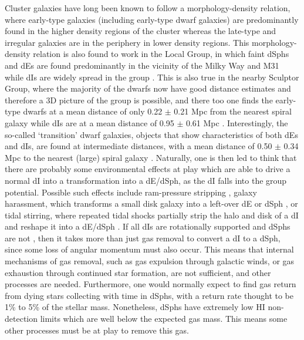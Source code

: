 \documentclass[preprint]{aastex}
\begin{document}
Cluster galaxies have long been known to follow a morphology-density
relation, where early-type galaxies (including early-type dwarf galaxies)
are predominantly found in the higher density regions of the cluster whereas
the late-type and irregular galaxies are in the periphery in lower
density regions. This morphology-density relation is also found to work
in the Local Group, in which faint dSphs and dEs
are found predominantly in the vicinity of the Milky Way and M31 while
dIs are widely spread in the group \citep{vdb94a}.
This is also true in the nearby Sculptor Group, where the 
majority of the dwarfs now have good distance estimates and therefore a 3D
picture of the group is possible, and there too one finds the early-type
dwarfs at a mean distance of only 0.22 $\pm$ 0.21 Mpc from the nearest spiral  
galaxy while dIs are at a mean distance of 0.95 $\pm$ 0.61 Mpc \citep{scm03a}. 
Interestingly, the so-called `transition' dwarf galaxies,
objects that show characteristics of both dEs and dIs, are found
at intermediate distances,
with a mean distance of 0.50 $\pm$ 0.34 Mpc to the nearest
(large) spiral galaxy \citep{scm03a}. Naturally, one is then led to think that there
are probably some environmental effects at play which are able to drive
a normal dI into a transformation
into a dE/dSph, as the dI falls into
the group potential. Possible such effects include ram-pressure stripping
\citep{gg72}, galaxy harassment, which transforms a small
disk galaxy into a left-over dE or dSph \citep{mkldo96}, or tidal
stirring, where repeated tidal shocks partially strip the halo and disk
of a dI and reshape it into a dE/dSph \citep{mgcmqwsl01a, mgcmqwsl01b}.
If all dIs are rotationally supported and dSphs are not \citep[although there
is mounting evidence that this is not strictly true, e.g.,][]
{ddzh04, ggrc06}, then it takes more than just
gas removal to convert a dI to a dSph, since some loss of angular momentum
must also occur. This means that internal mechanisms
of gas removal, such as gas expulsion through galactic winds, or gas exhaustion 
through continued star formation, are not sufficient, and other processes
are needed. Furthermore, one would normally expect to find gas return from
dying stars collecting with time in dSphs, with a return rate thought to be
1\% to 5\% of the stellar mass. Nonetheless, dSphs have extremely low HI 
non-detection limits
which are well below the expected gas mass. This means some other processes
must be at play to remove this gas.
\end{document}
